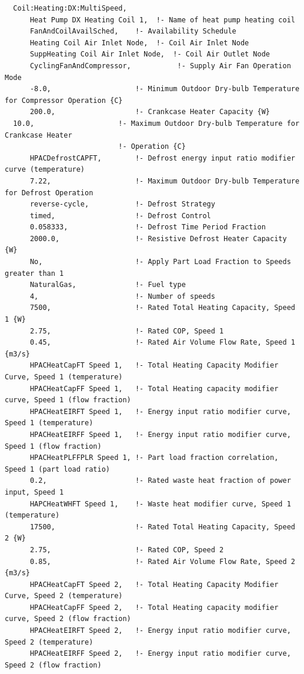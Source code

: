 \begin{lstlisting}
  Coil:Heating:DX:MultiSpeed,
      Heat Pump DX Heating Coil 1,  !- Name of heat pump heating coil
      FanAndCoilAvailSched,    !- Availability Schedule
      Heating Coil Air Inlet Node,  !- Coil Air Inlet Node
      SuppHeating Coil Air Inlet Node,  !- Coil Air Outlet Node
      CyclingFanAndCompressor,           !- Supply Air Fan Operation Mode
      -8.0,                    !- Minimum Outdoor Dry-bulb Temperature for Compressor Operation {C}
      200.0,                   !- Crankcase Heater Capacity {W}
  10.0,                    !- Maximum Outdoor Dry-bulb Temperature for Crankcase Heater
                           !- Operation {C}
      HPACDefrostCAPFT,        !- Defrost energy input ratio modifier curve (temperature)
      7.22,                    !- Maximum Outdoor Dry-bulb Temperature for Defrost Operation
      reverse-cycle,           !- Defrost Strategy
      timed,                   !- Defrost Control
      0.058333,                !- Defrost Time Period Fraction
      2000.0,                  !- Resistive Defrost Heater Capacity {W}
      No,                      !- Apply Part Load Fraction to Speeds greater than 1
      NaturalGas,              !- Fuel type
      4,                       !- Number of speeds
      7500,                    !- Rated Total Heating Capacity, Speed 1 {W}
      2.75,                    !- Rated COP, Speed 1
      0.45,                    !- Rated Air Volume Flow Rate, Speed 1 {m3/s}
      HPACHeatCapFT Speed 1,   !- Total Heating Capacity Modifier Curve, Speed 1 (temperature)
      HPACHeatCapFF Speed 1,   !- Total Heating capacity modifier curve, Speed 1 (flow fraction)
      HPACHeatEIRFT Speed 1,   !- Energy input ratio modifier curve, Speed 1 (temperature)
      HPACHeatEIRFF Speed 1,   !- Energy input ratio modifier curve, Speed 1 (flow fraction)
      HPACHeatPLFFPLR Speed 1, !- Part load fraction correlation, Speed 1 (part load ratio)
      0.2,                     !- Rated waste heat fraction of power input, Speed 1
      HAPCHeatWHFT Speed 1,    !- Waste heat modifier curve, Speed 1 (temperature)
      17500,                   !- Rated Total Heating Capacity, Speed 2 {W}
      2.75,                    !- Rated COP, Speed 2
      0.85,                    !- Rated Air Volume Flow Rate, Speed 2 {m3/s}
      HPACHeatCapFT Speed 2,   !- Total Heating Capacity Modifier Curve, Speed 2 (temperature)
      HPACHeatCapFF Speed 2,   !- Total Heating capacity modifier curve, Speed 2 (flow fraction)
      HPACHeatEIRFT Speed 2,   !- Energy input ratio modifier curve, Speed 2 (temperature)
      HPACHeatEIRFF Speed 2,   !- Energy input ratio modifier curve, Speed 2 (flow fraction)

\end{lstlisting}
